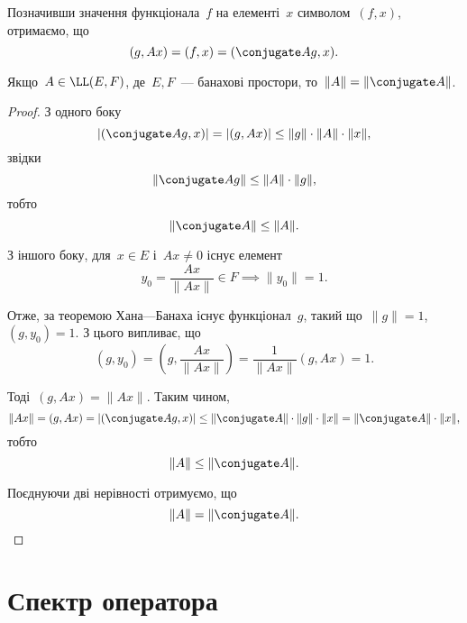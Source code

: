 Позначивши значення функціонала~$f$ на елементі~$x$
символом~$(f, x)$, отримаємо, що
\begin{equation*}
    (g, Ax) = (f, x) = (\conjugate A g, x).    
\end{equation*}

\begin{theorem}
Якщо~$A \in \LL(E, F)$, де~$E, F$~--- банахові
простори, то~$\|A\| = \|\conjugate A\|$.
\end{theorem}

\begin{proof}
З одного боку
\begin{equation*}
    |(\conjugate A g, x)| = |(g, A x)| \le \|g\| \cdot \|A\| \cdot \|x\|,
\end{equation*}
звідки
\begin{equation*}
    \|\conjugate A g\| \le \|A\| \cdot \|g\|,
\end{equation*}
тобто
\begin{equation*}
    \|\conjugate A\| \le \|A\|.
\end{equation*}

З іншого боку, для~$x \in E$ і~$Ax \ne 0$ існує елемент
\begin{equation*}
    y_0 = \frac{Ax}{\|Ax\|} \in F \implies \|y_0\| = 1.
\end{equation*}

Отже, за теоремою Хана---Банаха існує функціонал~$g$, такий
що~$\|g\| = 1$,~$(g, y_0) = 1$. З цього випливає, що
\begin{equation*}
    (g, y_0) = \left( g, \frac{Ax}{\|Ax\|} \right) = \frac{1}{\|Ax\|} (g, Ax) = 1.
\end{equation*}

Тоді~$(g, Ax) = \|Ax\|$. Таким чином,
\begin{equation*}
    \|Ax\| = (g, Ax) = |(\conjugate A g, x)| \le \|\conjugate A\| \cdot \|g\| \cdot \|x\| = \|\conjugate A\| \cdot \|x\|,
\end{equation*}
тобто
\begin{equation*}
    \|A\| \le \|\conjugate A\|.
\end{equation*}

Поєднуючи дві нерівності отримуємо, що
\begin{equation*}
    \|A\| = \|\conjugate A\|. \qedhere
\end{equation*}
\end{proof}

\section{Спектр оператора}

